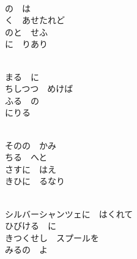 \documentclass[10pt,b5j]{tarticle} %
\begin{document}
\begin{enumerate}
\begin{minipage}[c]{\blocksize}
    \end{minipage}
    \begin{minipage}[c]{\blocksize}
        
        \vspace{\linespace}
        \item~\\
        の　は\\
        く　あせたれど\\
        のと　せふ\\
        に　りあり
        
    \end{minipage}
    \begin{minipage}[c]{\blocksize}
        
        \vspace{\linespace}
        \item~\\
        まる　に\\
        ちしつつ　めけば\\
        ふる　の\\
        にりる　
        
    \end{minipage}
    \begin{minipage}[c]{\blocksize}
        
        \vspace{\linespace}
        \item~\\
        そのの　かみ\\
        ちる　へと\\
        さすに　はえ\\
        きひに　るなり
        
    \end{minipage}
    \begin{minipage}[c]{\blocksize}
        
        \vspace{\linespace}
        \item~\\
        シルバーシャンツェに　はくれて\\
        ひびける　に\\
        きつくせし　スプールを\\
        みるの　よ
        

\end{minipage}
\end{enumerate}
\end{document}
